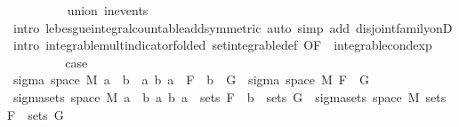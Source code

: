 \begin{isabellebody}
\ \ \ \ \ \ \ \ \isamarkupfalse%
\ union\ in{\isacharunderscore}{\kern0pt}events\isanewline
\ \ \ \ \ \ \ \ \isamarkupfalse%
\ {\isacharparenleft}{\kern0pt}intro\ lebesgue{\isacharunderscore}{\kern0pt}integral{\isacharunderscore}{\kern0pt}countable{\isacharunderscore}{\kern0pt}add{\isacharbrackleft}{\kern0pt}symmetric{\isacharbrackright}{\kern0pt}{\isacharparenright}{\kern0pt}\ {\isacharparenleft}{\kern0pt}auto\ simp\ add{\isacharcolon}{\kern0pt}\ disjoint{\isacharunderscore}{\kern0pt}family{\isacharunderscore}{\kern0pt}onD\ intro{\isacharbang}{\kern0pt}{\isacharcolon}{\kern0pt}\ integrable{\isacharunderscore}{\kern0pt}mult{\isacharunderscore}{\kern0pt}indicator{\isacharbrackleft}{\kern0pt}folded\ set{\isacharunderscore}{\kern0pt}integrable{\isacharunderscore}{\kern0pt}def{\isacharcomma}{\kern0pt}\ OF\ {\isacharunderscore}{\kern0pt}\ integrable{\isacharunderscore}{\kern0pt}cond{\isacharunderscore}{\kern0pt}exp{\isacharbrackright}{\kern0pt}{\isacharparenright}{\kern0pt}\ \isanewline
\ \ \ \ \ \ \isamarkupfalse%
\ \isamarkupfalse%
\ {\isacharquery}{\kern0pt}case\ \isacommand{{\isachardot}{\kern0pt}}\isamarkupfalse%
\isanewline
\ \ \ \ \isamarkupfalse%
\isanewline
\ \ \isacommand{{\isacharbraceright}{\kern0pt}}\isamarkupfalse%
\isanewline
\ \ \isamarkupfalse%
\ \isamarkupfalse%
\ {\isachardoublequoteopen}sigma\ {\isacharparenleft}{\kern0pt}space\ M{\isacharparenright}{\kern0pt}\ {\isacharbraceleft}{\kern0pt}a\ {\isasyminter}\ b\ {\isacharbar}{\kern0pt}\ a\ b{\isachardot}{\kern0pt}\ a\ {\isasymin}\ F\ {\isasymand}\ b\ {\isasymin}\ G{\isacharbraceright}{\kern0pt}\ {\isacharequal}{\kern0pt}\ sigma\ {\isacharparenleft}{\kern0pt}space\ M{\isacharparenright}{\kern0pt}\ {\isacharparenleft}{\kern0pt}F\ {\isasymunion}\ G{\isacharparenright}{\kern0pt}{\isachardoublequoteclose}\isanewline
\ \ \isamarkupfalse%
\ {\isacharminus}{\kern0pt}\isanewline
\ \ \ \ \isamarkupfalse%
\ {\isachardoublequoteopen}sigma{\isacharunderscore}{\kern0pt}sets\ {\isacharparenleft}{\kern0pt}space\ M{\isacharparenright}{\kern0pt}\ {\isacharbraceleft}{\kern0pt}a\ {\isasyminter}\ b\ {\isacharbar}{\kern0pt}a\ b{\isachardot}{\kern0pt}\ a\ {\isasymin}\ sets\ F\ {\isasymand}\ b\ {\isasymin}\ sets\ G{\isacharbraceright}{\kern0pt}\ {\isacharequal}{\kern0pt}\ sigma{\isacharunderscore}{\kern0pt}sets\ {\isacharparenleft}{\kern0pt}space\ M{\isacharparenright}{\kern0pt}\ {\isacharparenleft}{\kern0pt}sets\ F\ {\isasymunion}\ sets\ G{\isacharparenright}{\kern0pt}{\isachardoublequoteclose}\isanewline

\end{isabellebody}
